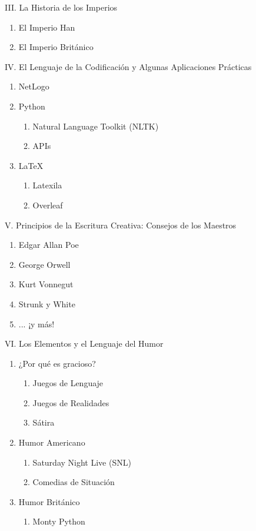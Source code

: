 \documentclass[12pt]{article}
\begin{document}
\noindent III. La Historia de los Imperios
\begin{enumerate}
    \item El Imperio Han
    \item El Imperio Británico
\end{enumerate}

\noindent IV. El Lenguaje de la Codificación y Algunas Aplicaciones Prácticas
\begin{enumerate}
    \item NetLogo
    \item Python
    \begin{enumerate}
        \item Natural Language Toolkit (NLTK)
        \item APIs
    \end{enumerate}
    \item LaTeX
    \begin{enumerate}
        \item Latexila
        \item Overleaf
    \end{enumerate}
\end{enumerate}

\noindent V. Principios de la Escritura Creativa: Consejos de los Maestros
\begin{enumerate}
    \item Edgar Allan Poe
    \item George Orwell
    \item Kurt Vonnegut
    \item Strunk y White
    \item ... ¡y más!
\end{enumerate}

\noindent VI. Los Elementos y el Lenguaje del Humor
\begin{enumerate}
    \item ¿Por qué es gracioso?
    \begin{enumerate}
        \item Juegos de Lenguaje
        \item Juegos de Realidades
        \item Sátira
    \end{enumerate}
    \item Humor Americano
    \begin{enumerate}
        \item Saturday Night Live (SNL)
        \item Comedias de Situación
    \end{enumerate}
    \item Humor Británico
    \begin{enumerate}
        \item Monty Python
    \end{enumerate}
\end{enumerate}
\end{document}
